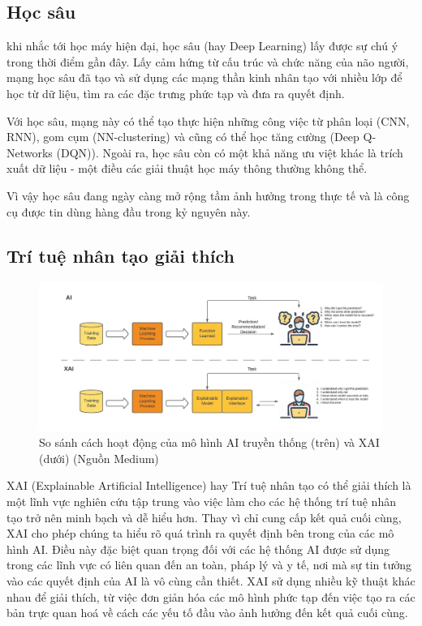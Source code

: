 \subsection{Học sâu}
khi nhắc tới học máy hiện đại, học sâu (hay Deep Learning) lấy được sự chú ý trong thời điểm gần đây. Lấy cảm hứng từ cấu trúc và chức năng của não người, mạng học sâu đã tạo và sử dụng các mạng thần kinh nhân tạo với nhiều lớp để học từ dữ liệu, tìm ra các đặc trưng phức tạp và đưa ra quyết định.

Với học sâu, mạng này có thể tạo thực hiện những công việc từ phân loại (CNN, RNN), gom cụm (NN-clustering) và cũng có thể học tăng cường (Deep Q-Networks (DQN)). Ngoài ra, học sâu còn có một khả năng ưu việt khác là trích xuất dữ liệu - một điều các giải thuật học máy thông thường không thể.

Vì vậy học sâu đang ngày càng mở rộng tầm ảnh hưởng trong thực tế và là công cụ được tin dùng hàng đầu trong kỷ nguyên này.

\subsection{Trí tuệ nhân tạo giải thích}
\begin{figure}[!ht]
    \centering
    \includegraphics[width=\linewidth]{XAI.jpeg}
    \caption[]{So sánh cách hoạt động của mô hình AI truyền thống (trên) và XAI (dưới) (Nguồn Medium\footnotemark)}
    \label{fig:enter-label}
    

\end{figure}
XAI (Explainable Artificial Intelligence) hay Trí tuệ nhân tạo có thể giải thích là một lĩnh vực nghiên cứu tập trung vào việc làm cho các hệ thống trí tuệ nhân tạo trở nên minh bạch và dễ hiểu hơn. Thay vì chỉ cung cấp kết quả cuối cùng, XAI cho phép chúng ta hiểu rõ quá trình ra quyết định bên trong của các mô hình AI. Điều này đặc biệt quan trọng đối với các hệ thống AI được sử dụng trong các lĩnh vực có liên quan đến an toàn, pháp lý và y tế, nơi mà sự tin tưởng vào các quyết định của AI là vô cùng cần thiết. XAI sử dụng nhiều kỹ thuật khác nhau để giải thích, từ việc đơn giản hóa các mô hình phức tạp đến việc tạo ra các bản trực quan hoá về cách các yếu tố đầu vào ảnh hưởng đến kết quả cuối cùng.

